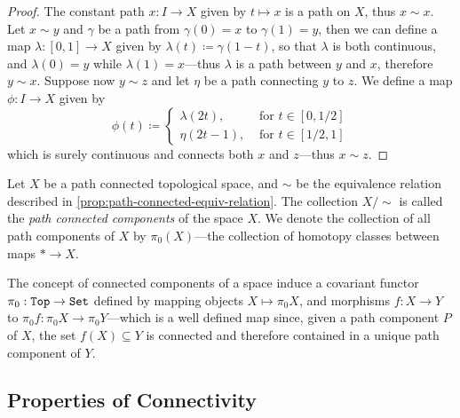 \begin{proof}
    The constant path \(x: I \to X\) given by \(t \mapsto x\) is a path on \(X\),
    thus \(x \sim x\). Let \(x \sim y\) and \(\gamma\) be a path from
    \(\gamma(0) = x\) to \(\gamma(1) = y\), then we can define a map
    \(\lambda: [0, 1] \to X\) given by \(\lambda(t) \coloneq \gamma(1 - t)\), so
    that \(\lambda\) is both continuous, and \(\lambda(0) = y\) while
    \(\lambda(1) = x\)---thus \(\lambda\) is a path between \(y\) and \(x\),
    therefore \(y \sim x\). Suppose now \(y \sim z\) and let \(\eta\) be a path
    connecting \(y\) to \(z\). We define a map \(\phi: I \to X\) given by
    \[
        \phi(t) \coloneq
        \begin{cases}
            \lambda(2t),  & \text{ for } t \in [0, 1/2] \\
            \eta(2t - 1), & \text{ for } t \in [1/2, 1]
        \end{cases}
    \]
    which is surely continuous and connects both \(x\) and \(z\)---thus \(x \sim
    z\).
\end{proof}

\begin{definition}
    \label{def:path-connected-components}
    Let \(X\) be a path connected topological space, and \(\sim\) be the equivalence
    relation described in \cref{prop:path-connected-equiv-relation}. The collection
    \(X/{\sim}\) is called the \emph{path connected components} of the space
    \(X\). We denote the collection of all path components of \(X\) by
    \(\pi_0(X)\)---the collection of homotopy classes between maps \(* \to X\).
\end{definition}

\begin{definition}[\(\pi_0\) functor]
    \label{def:pi0-functor}
    The concept of connected components of a space induce a covariant functor
    \(\pi_0: {\texttt{Top}} \to {\texttt{Set}}\) defined by mapping objects \(X \mapsto \pi_0 X\), and
    morphisms \(f: X \to Y\) to \(\pi_0 f: \pi_0 X \to \pi_0 Y\)---which is a well
    defined map since, given a path component \(P\) of \(X\), the set \(f(X)
    \subseteq Y\) is connected and therefore contained in a unique path component of
    \(Y\).
\end{definition}

\subsection{Properties of Connectivity}

